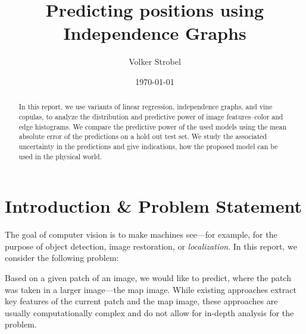 \documentclass{article}
\title{Predicting positions using Independence Graphs}
\author{Volker Strobel}
\date{\today}
\begin{document}
\maketitle









\begin{abstract}
  In this report, we use variants of linear regression, independence
  graphs, and vine copulas, to analyze the distribution and predictive
  power of image features--color and edge histograms. We compare the
  predictive power of the used models using the mean absolute error of
  the predictions on a hold out test set. We study the associated
  uncertainty in the predictions and give indications, how the
  proposed model can be used in the physical world.
\end{abstract}

\section{Introduction \& Problem Statement}


The goal of computer vision is to make machines see---for example, for
the purpose of object detection, image restoration, or
\emph{localization}. In this report, we consider the following
problem:

Based on a given patch of an image, we would like to predict, where
the patch was taken in a larger image---the map image. While existing
approaches extract key features of the current patch and the map
image, these approaches are usually computationally complex and do not
allow for in-depth analysis for the problem. 
\end{document}
